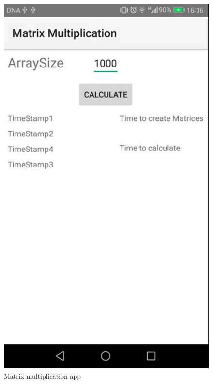 \documentclass[a4paper, 11pt]{report}
\begin{document}
\begin{figure}[ht]
\centering
	\begin{minipage}[t]{0.4\textwidth}
		\includegraphics[scale=0.4]{images/app1layout.pdf}
		\caption{Matrix multiplication app}\label{fig:app1layout}
	\end{minipage}
	\begin{minipage}[t]{0.4\textwidth}

\end{minipage}
\end{figure}
\end{document}
